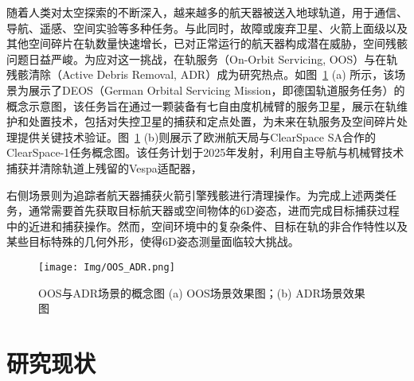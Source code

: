 随着人类对太空探索的不断深入，越来越多的航天器被送入地球轨道，用于通信、导航、遥感、空间实验等多种任务\cite{prol2022position,zhao2022overview,nozawa2023extent}。与此同时，故障或废弃卫星、火箭上面级以及其他空间碎片在轨数量快速增长，已对正常运行的航天器构成潜在威胁，空间残骸问题日益严峻\cite{debris1,debris2}。为应对这一挑战，在轨服务（On-Orbit Servicing, OOS）\cite{ma2023advances,nwac129,asri2024introductory,wang2023bridging}与在轨残骸清除（Active Debris Removal, ADR）\cite{BARANOV2024100982,CREASER2024481,BAREA20243060,WANG2025}成为研究热点。如图~\ref{fig:OOS_ADR} (a) 所示，该场景为展示了DEOS（German Orbital Servicing Mission，即德国轨道服务任务）的概念示意图，该任务旨在通过一颗装备有七自由度机械臂的服务卫星，展示在轨维护和处置技术，包括对失控卫星的捕获和定点处置，为未来在轨服务及空间碎片处理提供关键技术验证。图~\ref{fig:OOS_ADR} (b)则展示了欧洲航天局与ClearSpace SA合作的ClearSpace-1任务概念图。该任务计划于2025年发射，利用自主导航与机械臂技术捕获并清除轨道上残留的Vespa适配器，


右侧场景则为追踪者航天器捕获火箭引擎残骸进行清理操作。为完成上述两类任务，通常需要首先获取目标航天器或空间物体的6D姿态，进而完成目标捕获过程中的近进和捕获操作。然而，空间环境中的复杂条件\cite{aerospace10120997}、目标在轨的非合作特性\cite{PAULY2023339}以及某些目标特殊的几何外形，使得6D姿态测量面临较大挑战。
\begin{figure}[htbp]
	\centering
	\texttt{[image: Img/OOS\_ADR.png]}
	\caption{OOS与ADR场景的概念图 (a) OOS场景效果图；(b) ADR场景效果图}
	\label{fig:OOS_ADR}
\end{figure}

\section{研究现状}

